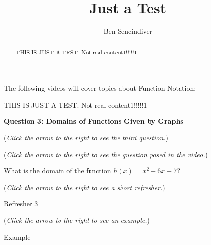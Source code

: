 \documentclass{ximera}
\title[Prerequisite Videos: ]{Just a Test}
\author{Ben Sencindiver}
\begin{document}
\begin{abstract}
THIS IS JUST A TEST. Not real content1!!!!!1
\end{abstract}
\maketitle

The following videos will cover topics about Function Notation:


THIS IS JUST A TEST. Not real content1!!!!!1

\textbf{Question 3: Domains of Functions Given by Graphs}
\begin{question}
\begin{flushright}
{\color{blue}(\emph{Click the arrow to the right to see the third question.})}
\end{flushright}
\begin{center}
\begin{expandable}

{\color{blue}(\emph{Click the arrow to the right to see the question
posed in the video.})}

\begin{expandable}
What is the domain of the function $h(x)= x^2+6x -7$?

\begin{multipleChoice}
\choice{$[1,7]$}
\choice{$[0,\infty)$}
\choice{$(-\infty,0]$}
\end{multipleChoice}

\begin{flushright}
{\color{blue}(\emph{Click the arrow to the right to see a short refresher.})}
\end{flushright}
\begin{expandable}
Refresher 3
\end{expandable}
\begin{flushright}
{\color{blue}(\emph{Click the arrow to the right to see an example.})}
\end{flushright}
\begin{expandable}
Example
\end{expandable}
\end{expandable}
\end{expandable}
\end{center}
\end{question}
\end{document}

